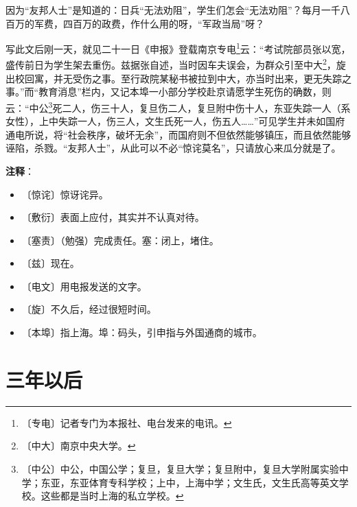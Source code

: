 \documentclass[12pt,UTF-8,openany]{ctexbook}
\begin{document}
\begin{normalsize}
    因为“友邦人士”是知道的：日兵“无法劝阻”，学生们怎会“无法劝阻”？每月一千八百万的军费，四百万的政费，作什么用的呀，“军政当局”呀？
    
    写此文后刚一天，就见二十一日《申报》登载南京专电\footnote{〔专电〕记者专门为本报社、电台发来的电讯。}云：“考试院部员张以宽，盛传前日为学生架去重伤。兹据张自述，当时因车夫误会，为群众引至中大\footnote{〔中大〕南京中央大学。}，旋出校回寓，并无受伤之事。至行政院某秘书被拉到中大，亦当时出来，更无失踪之事。”而“教育消息”栏内，又记本埠一小部分学校赴京请愿学生死伤的确数，则云：“中公\footnote{〔中公〕中公，中国公学；复旦，复旦大学；复旦附中，复旦大学附属实验中学；东亚，东亚体育专科学校；上中，上海中学；文生氏，文生氏高等英文学校。这些都是当时上海的私立学校。}死二人，伤三十人，复旦伤二人，复旦附中伤十人，东亚失踪一人（系女性），上中失踪一人，伤三人，文生氏死一人，伤五人……”可见学生并未如国府通电所说，将“社会秩序，破坏无余”，而国府则不但依然能够镇压，而且依然能够诬陷，杀戮。“友邦人士”，从此可以不必“惊诧莫名”，只请放心来瓜分就是了。
    
\end{normalsize}


\newpage

\textbf{注释}：

\vspace{-1em}

\begin{itemize}
    \setlength\itemsep{-0.2em}
    \item 〔惊诧〕惊讶诧异。
    \item 〔敷衍〕表面上应付，其实并不认真对待。
    \item 〔塞责〕（勉强）完成责任。塞：闭上，堵住。
    \item 〔兹〕现在。
    \item 〔电文〕用电报发送的文字。
    \item 〔旋〕不久后，经过很短时间。
    \item 〔本埠〕指上海。埠：码头，引申指与外国通商的城市。
\end{itemize}

\chapter{三年以后}
\end{document}
